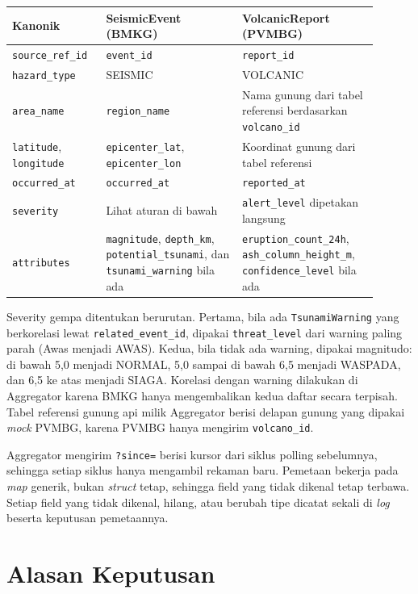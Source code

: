 \begin{longtable}[]{|>{\raggedright\arraybackslash}p{0.22\linewidth}|>{\raggedright\arraybackslash}p{0.34\linewidth}|>{\raggedright\arraybackslash}p{0.34\linewidth}|}
\hline
Kanonik & SeismicEvent (BMKG) & VolcanicReport (PVMBG) \\
\hline
\endhead
\texttt{source\_ref\_id} & \texttt{event\_id} & \texttt{report\_id} \\
\hline
\texttt{hazard\_type} & SEISMIC & VOLCANIC \\
\hline
\texttt{area\_name} & \texttt{region\_name} & Nama gunung dari tabel referensi berdasarkan \texttt{volcano\_id} \\
\hline
\texttt{latitude}, \texttt{longitude} & \texttt{epicenter\_lat}, \texttt{epicenter\_lon} & Koordinat gunung dari tabel referensi \\
\hline
\texttt{occurred\_at} & \texttt{occurred\_at} & \texttt{reported\_at} \\
\hline
\texttt{severity} & Lihat aturan di bawah & \texttt{alert\_level} dipetakan langsung \\
\hline
\texttt{attributes} & \texttt{magnitude}, \texttt{depth\_km}, \texttt{potential\_tsunami}, dan \texttt{tsunami\_warning} bila ada & \texttt{eruption\_count\_24h}, \texttt{ash\_column\_height\_m}, \texttt{confidence\_level} bila ada \\
\hline
\end{longtable}

Severity gempa ditentukan berurutan. Pertama, bila ada \texttt{TsunamiWarning} yang berkorelasi lewat \texttt{related\_event\_id}, dipakai \texttt{threat\_level} dari warning paling parah (Awas menjadi AWAS). Kedua, bila tidak ada warning, dipakai magnitudo: di bawah 5,0 menjadi NORMAL, 5,0 sampai di bawah 6,5 menjadi WASPADA, dan 6,5 ke atas menjadi SIAGA. Korelasi dengan warning dilakukan di Aggregator karena BMKG hanya mengembalikan kedua daftar secara terpisah. Tabel referensi gunung api milik Aggregator berisi delapan gunung yang dipakai \textit{mock} PVMBG, karena PVMBG hanya mengirim \texttt{volcano\_id}.

Aggregator mengirim \texttt{?since=} berisi kursor dari siklus polling sebelumnya, sehingga setiap siklus hanya mengambil rekaman baru. Pemetaan bekerja pada \textit{map} generik, bukan \textit{struct} tetap, sehingga field yang tidak dikenal tetap terbawa. Setiap field yang tidak dikenal, hilang, atau berubah tipe dicatat sekali di \textit{log} beserta keputusan pemetaannya.

\section{Alasan Keputusan}

